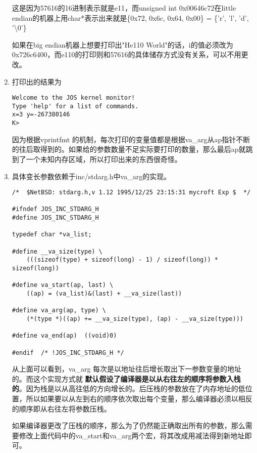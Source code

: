 \documentclass{article}
\newcommand{\highlight}[1]{{\bfseries \color{red}  #1}}
\newcommand{\funcname}[1]{{\ttfamily \small #1}}
\begin{document}
\begin{CJK*}{UTF8}{gkai}
\begin{enumerate}
{这是因为57616的16进制表示就是e11，而unsigned \hspace{0.5ex} int \hspace{1ex} 0x00646c72在little endian的机器上用char*表示出来就是\{0x72, 0x6c, 0x64, 0x00\} = \{'r', 'l', 'd', '\textbackslash 0'\}

如果在big endian机器上想要打印出"He110 World"的话，i的值必须改为0x726c6400，而e110的打印则和57616的具体储存方式没有关系，可以不用更改。

}
\item{打印出的结果为

\begin{lstlisting}[style=console]
Welcome to the JOS kernel monitor!
Type 'help' for a list of commands.
x=3 y=-267380146
K> 
\end{lstlisting}

因为根据\funcname{vprintfmt} 的机制，每次打印的变量值都是根据va\_arg从ap指针不断的往后取得到的。如果给的参数数量不足实际要打印的数量，那么最后ap就跳到了一个未知内存区域，所以打印出来的东西很奇怪。

}
\item{ 具体变长参数依赖于inc/stdarg.h中\funcname{va\_arg}的实现。
\begin{lstlisting}[style=ccode, title={\scriptsize \ttfamily \bfseries inc/stdarg.h}]
/*	$NetBSD: stdarg.h,v 1.12 1995/12/25 23:15:31 mycroft Exp $	*/

#ifndef JOS_INC_STDARG_H
#define	JOS_INC_STDARG_H

typedef char *va_list;

#define	__va_size(type) \
	(((sizeof(type) + sizeof(long) - 1) / sizeof(long)) * sizeof(long))

#define	va_start(ap, last) \
	((ap) = (va_list)&(last) + __va_size(last))

#define	va_arg(ap, type) \
	(*(type *)((ap) += __va_size(type), (ap) - __va_size(type)))

#define	va_end(ap)	((void)0)

#endif	/* !JOS_INC_STDARG_H */
\end{lstlisting}

从上面可以看到，\funcname{va\_arg} 每次是以地址往后增长取出下一参数变量的地址的。而这个实现方式就\highlight{默认假设了编译器是以从右往左的顺序将参数入栈的}。因为栈是以从高往低的方向增长的。后压栈的参数放在了内存地址的低位置，所以如果要以从左到右的顺序依次取出每个变量，那么编译器必须以相反的顺序即从右往左将参数压栈。

如果编译器更改了压栈的顺序，那么为了仍然能正确取出所有的参数，那么需要修改上面代码中的\funcname{va\_start}和\funcname{va\_arg}两个宏，将其改成用减法得到新地址即可。
}
\end{enumerate}


\end{CJK*}
\end{document}

